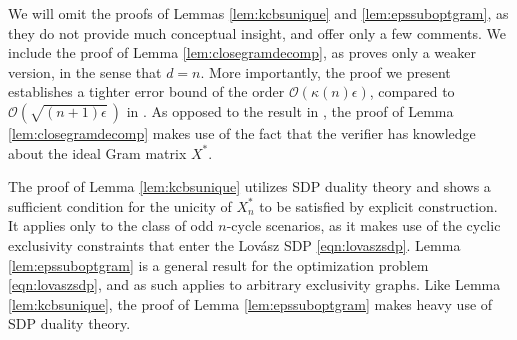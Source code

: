 We will omit the proofs of Lemmas \ref{lem:kcbsunique} and \ref{lem:epssuboptgram}, as they do not provide much conceptual insight, and offer only a few comments. We include the proof of Lemma \ref{lem:closegramdecomp}, as \cite{Bharti2019} proves only a weaker version, in the sense that $d=n$. More importantly, the proof we present establishes a tighter error bound of the order $\mathcal{O}(\kappa(n)\epsilon)$, compared to $\mathcal{O}(\sqrt{(n+1)\epsilon}\,)$ in \cite{Bharti2019}. As opposed to the result in \cite{Bharti2019}, the proof of Lemma \ref{lem:closegramdecomp} makes use of the fact that the verifier has knowledge about the ideal Gram matrix $X^*$. 

The proof of Lemma \ref{lem:kcbsunique} utilizes SDP duality theory and shows a sufficient condition for the unicity of $X^*_n$ to be satisfied by explicit construction. It applies only to the class of odd $n$-cycle scenarios, as it makes use of the cyclic exclusivity constraints that enter the Lovász SDP \ref{eqn:lovaszsdp}. Lemma \ref{lem:epssuboptgram} is a general result for the optimization problem \ref{eqn:lovaszsdp}, and as such applies to arbitrary exclusivity graphs. Like Lemma \ref{lem:kcbsunique}, the proof of Lemma \ref{lem:epssuboptgram} makes heavy use of SDP duality theory. 

